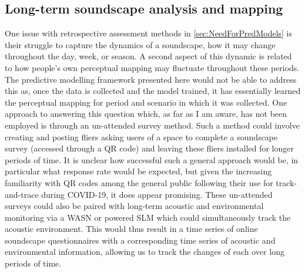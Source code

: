 \subsection{Long-term soundscape analysis and mapping}
One issue with retrospective assessment methods in \cref{sec:NeedForPredModels} is their struggle to capture the dynamics of a soundscape, how it may change throughout the day, week, or season. A second aspect of this dynamic is related to how people's own perceptual mapping may fluctuate throughout these periods. The predictive modelling framework presented here would not be able to address this as, once the data is collected and the model trained, it has essentially learned the perceptual mapping for period and scenario in which it was collected. One approach to answering this question which, as far as I am aware, has not been employed is through an un-attended survey method. Such a method could involve creating and posting fliers asking users of a space to complete a soundscape survey (accessed through a QR code) and leaving these fliers installed for longer periods of time. It is unclear how successful such a general approach would be, in particular what response rate would be expected, but given the increasing familiarity with QR codes among the general public following their use for track-and-trace during COVID-19, it does appear promising. These un-attended surveys could also be paired with long-term acoustic and environmental monitoring via a WASN or powered SLM which could simultaneously track the acoustic environment. This would thus result in a time series of online soundscape questionnaires with a corresponding time series of acoustic and environmental information, allowing us to track the changes of each over long periods of time.

